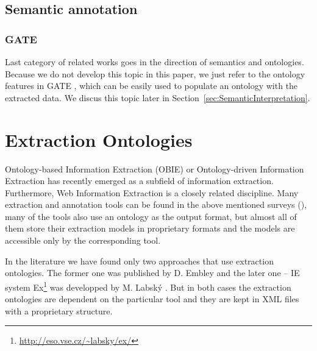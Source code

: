 \subsection{Semantic annotation}
\subsubsection{GATE}
Last category of related works goes in the direction of semantics and ontologies. Because we do not develop this topic in this paper, we just refer to the ontology features in GATE \citep{Bon04b}, which can be easily used to populate an ontology with the extracted data. We discus this topic later in Section~\ref{sec:SemanticInterpretation}.



\section{Extraction Ontologies} \label{sec:relwork_ext_ont}

Ontology-based Information Extraction (OBIE) \citep{citeulike:7291004} or Ontology-driven Information Extraction \citep{Yildiz:2007:OMO:1793154.1793216} has recently emerged as a subfield of information extraction. Furthermore, Web Information Extraction \citep{DBLP:journals/tkde/ChangKGS06} is a closely related discipline. Many extraction and annotation tools can be found in the above mentioned surveys (\citep{citeulike:7291004,DBLP:journals/tkde/ChangKGS06}), many of the tools also use an ontology as the output format, but almost all of them store their extraction models in proprietary formats and the models are accessible only by the corresponding tool.

In the literature we have found only two approaches that use extraction ontologies. The former one was published by D. Embley \citep{DBLP:conf/er/EmbleyTL02,Embley:2004:TSU:1012294.1012295}
and the later one -- IE system Ex\footnote{\url{http://eso.vse.cz/~labsky/ex/}} was developped by M. Labsk\'{y} \citep{springerlink:10.1007/978-3-642-01891-6_5}. 
But in both cases the extraction ontologies are dependent on the particular tool and they are kept in XML files with a proprietary structure.


